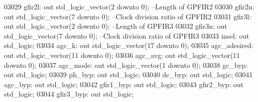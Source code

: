 \begin{DoxyCode}
03029         gfir2l: \textcolor{keywordflow}{out} \textcolor{comment}{std\_logic\_vector}(\textcolor{vhdllogic}{}\textcolor{vhdllogic}{2} \textcolor{keywordflow}{downto} \textcolor{vhdllogic}{}\textcolor{vhdllogic}{0});       \textcolor{keyword}{--Length of GPFIR2}
03030         gfir2n: \textcolor{keywordflow}{out} \textcolor{comment}{std\_logic\_vector}(\textcolor{vhdllogic}{}\textcolor{vhdllogic}{7} \textcolor{keywordflow}{downto} \textcolor{vhdllogic}{}\textcolor{vhdllogic}{0});       \textcolor{keyword}{--Clock division ratio of GPFIR2}
03031         gfir3l: \textcolor{keywordflow}{out} \textcolor{comment}{std\_logic\_vector}(\textcolor{vhdllogic}{}\textcolor{vhdllogic}{2} \textcolor{keywordflow}{downto} \textcolor{vhdllogic}{}\textcolor{vhdllogic}{0});       \textcolor{keyword}{--Length of GPFIR3}
03032         gfir3n: \textcolor{keywordflow}{out} \textcolor{comment}{std\_logic\_vector}(\textcolor{vhdllogic}{}\textcolor{vhdllogic}{7} \textcolor{keywordflow}{downto} \textcolor{vhdllogic}{}\textcolor{vhdllogic}{0});       \textcolor{keyword}{--Clock division ratio of GPFIR3}
03033         insel: \textcolor{keywordflow}{out} \textcolor{comment}{std\_logic};
03034         agc\_k: \textcolor{keywordflow}{out} \textcolor{comment}{std\_logic\_vector}(\textcolor{vhdllogic}{}\textcolor{vhdllogic}{17} \textcolor{keywordflow}{downto} \textcolor{vhdllogic}{}\textcolor{vhdllogic}{0});
03035         agc\_adesired: \textcolor{keywordflow}{out} \textcolor{comment}{std\_logic\_vector}(\textcolor{vhdllogic}{}\textcolor{vhdllogic}{11} \textcolor{keywordflow}{downto} \textcolor{vhdllogic}{}\textcolor{vhdllogic}{0});
03036         agc\_avg: \textcolor{keywordflow}{out} \textcolor{comment}{std\_logic\_vector}(\textcolor{vhdllogic}{}\textcolor{vhdllogic}{11} \textcolor{keywordflow}{downto} \textcolor{vhdllogic}{}\textcolor{vhdllogic}{0});
03037         agc\_mode: \textcolor{keywordflow}{out} \textcolor{comment}{std\_logic\_vector}(\textcolor{vhdllogic}{}\textcolor{vhdllogic}{1} \textcolor{keywordflow}{downto} \textcolor{vhdllogic}{}\textcolor{vhdllogic}{0});
03038         gc\_byp: \textcolor{keywordflow}{out} \textcolor{comment}{std\_logic};
03039         ph\_byp: \textcolor{keywordflow}{out} \textcolor{comment}{std\_logic};
03040         dc\_byp: \textcolor{keywordflow}{out} \textcolor{comment}{std\_logic};
03041         agc\_byp: \textcolor{keywordflow}{out} \textcolor{comment}{std\_logic};
03042         gfir1\_byp: \textcolor{keywordflow}{out} \textcolor{comment}{std\_logic};
03043         gfir2\_byp: \textcolor{keywordflow}{out} \textcolor{comment}{std\_logic};
03044         gfir3\_byp: \textcolor{keywordflow}{out} \textcolor{comment}{std\_logic};

\end{DoxyCode}
